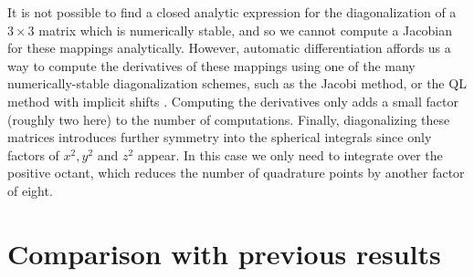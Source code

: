 \documentclass[reqno]{article}
\begin{document}
  It is not possible to find a closed analytic expression for the
  diagonalization of a $3\times 3$ matrix which is numerically stable, and so
  we cannot compute a Jacobian for these mappings analytically.
  However, automatic differentiation affords us a way to compute the derivatives
  of these mappings using one of the many numerically-stable diagonalization
  schemes, such as the Jacobi method, or the QL method with implicit shifts
  \cite{Kopp2008, trilinos-website, sacado-website}.
  Computing the derivatives only adds a small factor (roughly two here) to the
  number of computations.
  Finally, diagonalizing these matrices introduces further symmetry into the
  spherical integrals since only factors of $x^2, y^2$ and $z^2$ appear.
  In this case we only need to integrate over the positive octant, which reduces
  the number of quadrature points by another factor of eight.

  \section{Comparison with previous results}
\end{document}
